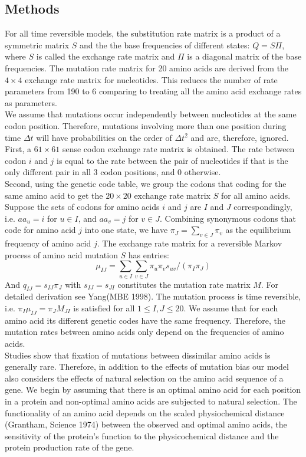 \documentclass[13pt]{article}
\begin{document}
\subsection{Methods}
For all time reversible models, the substitution rate matrix is a product of a symmetric matrix $S$ and the the base frequencies of different states: $Q = S\Pi$, where $S$ is called the exchange rate matrix and $\Pi$ is a diagonal matrix of the base frequencies. The mutation rate matrix for 20 amino acids are derived from the $4 \times 4 $ exchange rate matrix for nucleotides. This reduces the number of rate parameters from 190 to 6 comparing to treating all the amino acid exchange rates as parameters.\\

We assume that mutations occur independently between nucleotides at the same codon position. Therefore, mutations involving more than one position during time $\Delta t$ will have probabilities on the order of $\Delta t^2$ and are, therefore, ignored. First, a $61 \times 61$ sense codon exchange rate matrix is obtained. The rate between codon $i$ and $j$ is equal to the rate between the pair of nucleotides if that is the only different pair in all 3 codon positions, and 0 otherwise.\\


Second, using the genetic code table, we group the codons that coding for the same amino acid to get the $20 \times 20$ exchange rate matrix $S$ for all amino acids. Suppose the sets of codons for amino acids $i$ and $j$ are $I$ and $J$ correspondingly, i.e. $aa_u = i$ for $u \in I$, and $aa_v = j$ for $v \in J$. Combining synonymous codons that code for amino acid $j$ into one state, we have $\pi_J = \sum_{v \in J} \pi_v$ as the equilibrium frequency of amino acid $j$. The exchange rate matrix for a reversible Markov process of amino acid mutation $S$ has entries:
\[\mu_{IJ} = \sum_{u \in I} \sum_{v \in J} \pi_u \pi_v s_{uv} / (\pi_I \pi_J)\]
\noindent
And $q_{IJ} = s_{IJ} \pi_J$ with $s_{IJ}  = s_{JI}$ constitutes the mutation rate matrix $M$. For detailed derivation see Yang(MBE 1998). The mutation process is time reversible, i.e. $\pi_I \mu_{IJ} = \pi_J M_{JI}$ is satisfied for all $1 \le I,J \le 20$. We assume that for each amino acid its different genetic codes have the same frequency. Therefore, the mutation rates between amino acids only depend on the frequencies of amino acids. \\

Studies show that fixation of mutations between dissimilar amino acids is generally rare. Therefore, in addition to the effects of mutation bias our model also considers the effects of natural selection on the amino acid sequence of a gene. We begin by assuming that there is an optimal amino acid for each position in a protein and non-optimal amino acids are subjected to natural selection. The functionality of an amino acid depends on the scaled physiochemical distance (Grantham, Science 1974) between the observed and optimal amino acids, the sensitivity of the protein's function to the physicochemical distance and the protein production rate of the gene. \\
\end{document}
